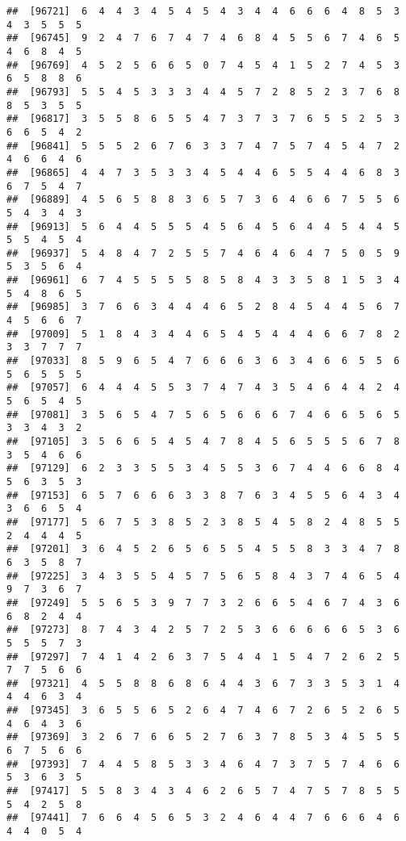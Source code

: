 \documentclass[
]{book}
\begin{document}
\begin{verbatim}
##  [96721]  6  4  4  3  4  5  4  5  4  3  4  4  6  6  6  4  8  5  3  4  3  5  5  5
##  [96745]  9  2  4  7  6  7  4  7  4  6  8  4  5  5  6  7  4  6  5  4  6  8  4  5
##  [96769]  4  5  2  5  6  6  5  0  7  4  5  4  1  5  2  7  4  5  3  6  5  8  8  6
##  [96793]  5  5  4  5  3  3  3  4  4  5  7  2  8  5  2  3  7  6  8  8  5  3  5  5
##  [96817]  3  5  5  8  6  5  5  4  7  3  7  3  7  6  5  5  2  5  3  6  6  5  4  2
##  [96841]  5  5  5  2  6  7  6  3  3  7  4  7  5  7  4  5  4  7  2  4  6  6  4  6
##  [96865]  4  4  7  3  5  3  3  4  5  4  4  6  5  5  4  4  6  8  3  6  7  5  4  7
##  [96889]  4  5  6  5  8  8  3  6  5  7  3  6  4  6  6  7  5  5  6  5  4  3  4  3
##  [96913]  5  6  4  4  5  5  5  4  5  6  4  5  6  4  4  5  4  4  5  5  5  4  5  4
##  [96937]  5  4  8  4  7  2  5  5  7  4  6  4  6  4  7  5  0  5  9  5  3  5  6  4
##  [96961]  6  7  4  5  5  5  5  8  5  8  4  3  3  5  8  1  5  3  4  5  4  8  6  5
##  [96985]  3  7  6  6  3  4  4  4  6  5  2  8  4  5  4  4  5  6  7  4  5  6  6  7
##  [97009]  5  1  8  4  3  4  4  6  5  4  5  4  4  4  6  6  7  8  2  3  3  7  7  7
##  [97033]  8  5  9  6  5  4  7  6  6  6  3  6  3  4  6  6  5  5  6  5  6  5  5  5
##  [97057]  6  4  4  4  5  5  3  7  4  7  4  3  5  4  6  4  4  2  4  5  6  5  4  5
##  [97081]  3  5  6  5  4  7  5  6  5  6  6  6  7  4  6  6  5  6  5  3  3  4  3  2
##  [97105]  3  5  6  6  5  4  5  4  7  8  4  5  6  5  5  5  6  7  8  3  5  4  6  6
##  [97129]  6  2  3  3  5  5  3  4  5  5  3  6  7  4  4  6  6  8  4  5  6  3  5  3
##  [97153]  6  5  7  6  6  6  3  3  8  7  6  3  4  5  5  6  4  3  4  3  6  6  5  4
##  [97177]  5  6  7  5  3  8  5  2  3  8  5  4  5  8  2  4  8  5  5  2  4  4  4  5
##  [97201]  3  6  4  5  2  6  5  6  5  5  4  5  5  8  3  3  4  7  8  6  3  5  8  7
##  [97225]  3  4  3  5  5  4  5  7  5  6  5  8  4  3  7  4  6  5  4  9  7  3  6  7
##  [97249]  5  5  6  5  3  9  7  7  3  2  6  6  5  4  6  7  4  3  6  6  8  2  4  4
##  [97273]  8  7  4  3  4  2  5  7  2  5  3  6  6  6  6  6  5  3  6  5  5  5  7  3
##  [97297]  7  4  1  4  2  6  3  7  5  4  4  1  5  4  7  2  6  2  5  7  7  5  6  6
##  [97321]  4  5  5  8  8  6  8  6  4  4  3  6  7  3  3  5  3  1  4  4  4  6  3  4
##  [97345]  3  6  5  5  6  5  2  6  4  7  4  6  7  2  6  5  2  6  5  4  6  4  3  6
##  [97369]  3  2  6  7  6  6  5  2  7  6  3  7  8  5  3  4  5  5  5  6  7  5  6  6
##  [97393]  7  4  4  5  8  5  3  3  4  6  4  7  3  7  5  7  4  6  6  5  3  6  3  5
##  [97417]  5  5  8  3  4  3  4  6  2  6  5  7  4  7  5  7  8  5  5  5  4  2  5  8
##  [97441]  7  6  6  4  5  6  5  3  2  4  6  4  4  7  6  6  6  4  6  4  4  0  5  4

\end{verbatim}
\end{document}
